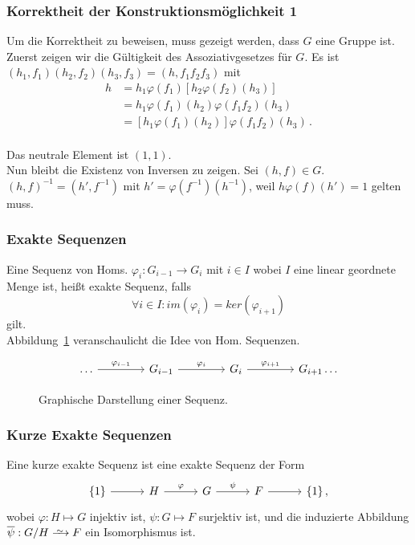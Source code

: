 \documentclass[12pt, german]{article}
\newcommand\iso{\xrightarrow{
		\,\smash{\raisebox{-0.65ex}{\ensuremath{\scriptstyle\sim}}}\,}}
\begin{document}
	\subsubsection{Korrektheit der Konstruktionsmöglichkeit 1}
	Um die Korrektheit zu beweisen, muss gezeigt werden, dass $G$ eine Gruppe ist.
	Zuerst zeigen wir die Gültigkeit des Assoziativgesetzes für $G$.
	Es ist $(h_1, f_1)(h_2, f_2)(h_3, f_3) = (h, f_1f_2f_3)$ mit 
	\begin{align*}
		h&=h_1\varphi(f_1)[h_2\varphi(f_2)(h_3)] \\
		&=h_1\varphi(f_1)(h_2)\varphi(f_1f_2)(h_3)\\
		&=[h_1\varphi(f_1)(h_2)]\varphi(f_1f_2)(h_3)\, .
	\end{align*} 
	\\ 
	Das neutrale Element ist $(1,1)$.\\
	Nun bleibt die Existenz von Inversen zu zeigen.
	Sei $(h,f)\in G$. $(h, f)^{-1} = (h', f^{-1})$ mit $h' = \varphi(f^{-1})(h^{-1})$, weil $h\varphi(f)(h')= 1$ gelten muss.
		
	\subsubsection{Exakte Sequenzen}
	Eine Sequenz von Homs. $\varphi_i: G_{i-1} \to G_i$ mit $i \in I$ wobei $I$ eine linear geordnete Menge ist, hei\ss t exakte Sequenz, falls $$\forall i \in I : im(\varphi_i) = ker(\varphi_{i+1})$$ gilt.\\
	Abbildung~\ref{fig:sequenz} veranschaulicht die Idee von Hom. Sequenzen.
	\begin{figure}[h!]
		\centering
		\begin{equation*}
			\begin{tikzcd}[column sep=3.5pc]
				\ldots \arrow{r}{\varphi_{i-1}} & G_{i -1} \arrow{r}{\varphi_{i}} & G_{i} \arrow{r}{\varphi_{i+1}} & G_{i+1} \ldots 
			\end{tikzcd}
		\end{equation*}
		\caption{Graphische Darstellung einer Sequenz.}
		\label{fig:sequenz}
	\end{figure}

	\subsubsection{Kurze Exakte Sequenzen}
	Eine kurze exakte Sequenz ist eine exakte Sequenz der Form 
		\begin{equation*}
			\begin{tikzcd}[column sep=2.5pc]
				\{1\} \arrow{r}{} & H \arrow{r}{\varphi} & G \arrow{r}{\psi} & F \arrow{r}{} & \{1\}\, ,
			\end{tikzcd}
		\end{equation*}
	wobei $\varphi: H \mapsto G$ injektiv ist, $\psi: G \mapsto F$ surjektiv ist, und die induzierte Abbildung $\overline{\psi} : G/H \iso F$ ein Isomorphismus ist.
	
\end{document}
